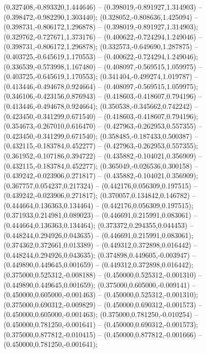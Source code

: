  (0.327408,-0.893320,1.444646) -- (0.398019,-0.891927,1.314903) -- (0.398472,-0.982290,1.303440);
 (0.328052,-0.808636,1.425094) -- (0.398731,-0.806172,1.296878) -- (0.398019,-0.891927,1.314903);
 (0.329762,-0.727671,1.373176) -- (0.400622,-0.724294,1.249046) -- (0.398731,-0.806172,1.296878);
 (0.332573,-0.649690,1.287875) -- (0.403725,-0.645619,1.170553) -- (0.400622,-0.724294,1.249046);
 (0.336539,-0.573998,1.167480) -- (0.408097,-0.569515,1.059975) -- (0.403725,-0.645619,1.170553);
 (0.341404,-0.499274,1.019787) -- (0.413446,-0.494678,0.924664) -- (0.408097,-0.569515,1.059975);
 (0.346106,-0.423156,0.876943) -- (0.418603,-0.418607,0.794196) -- (0.413446,-0.494678,0.924664);
 (0.350538,-0.345662,0.742242) -- (0.423450,-0.341299,0.671540) -- (0.418603,-0.418607,0.794196);
 (0.354673,-0.267010,0.616470) -- (0.427963,-0.262953,0.557355) -- (0.423450,-0.341299,0.671540);
 (0.358485,-0.187433,0.500387) -- (0.432115,-0.183784,0.452277) -- (0.427963,-0.262953,0.557355);
 (0.361952,-0.107186,0.394722) -- (0.435882,-0.104021,0.356909) -- (0.432115,-0.183784,0.452277);
 (0.365049,-0.026536,0.300158) -- (0.439242,-0.023906,0.271817) -- (0.435882,-0.104021,0.356909);
 (0.367757,0.054237,0.217324) -- (0.442176,0.056309,0.197515) -- (0.439242,-0.023906,0.271817);
 (0.370057,0.134842,0.146782) -- (0.444664,0.136363,0.134464) -- (0.442176,0.056309,0.197515);
 (0.371933,0.214981,0.089023) -- (0.446691,0.215991,0.083061) -- (0.444664,0.136363,0.134464);
 (0.373372,0.294355,0.044453) -- (0.448244,0.294926,0.043635) -- (0.446691,0.215991,0.083061);
 (0.374362,0.372661,0.013389) -- (0.449312,0.372898,0.016442) -- (0.448244,0.294926,0.043635);
 (0.374898,0.449605,-0.003947) -- (0.449890,0.449645,0.001659) -- (0.449312,0.372898,0.016442);
 (0.375000,0.525312,-0.008188) -- (0.450000,0.525312,-0.001310) -- (0.449890,0.449645,0.001659);
 (0.375000,0.605000,-0.009141) -- (0.450000,0.605000,-0.001463) -- (0.450000,0.525312,-0.001310);
 (0.375000,0.690312,-0.009829) -- (0.450000,0.690312,-0.001573) -- (0.450000,0.605000,-0.001463);
 (0.375000,0.781250,-0.010254) -- (0.450000,0.781250,-0.001641) -- (0.450000,0.690312,-0.001573);
 (0.375000,0.877812,-0.010415) -- (0.450000,0.877812,-0.001666) -- (0.450000,0.781250,-0.001641);
